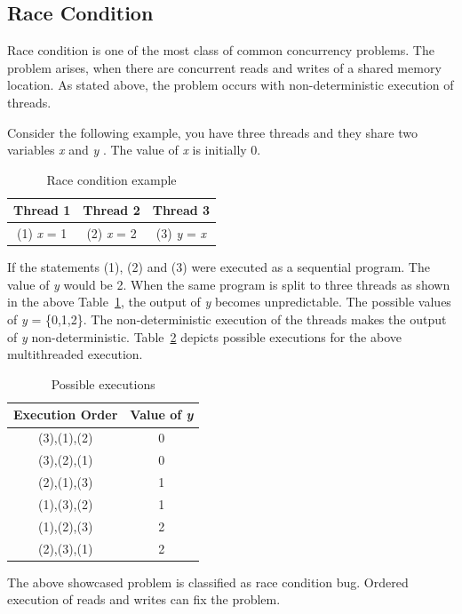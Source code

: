 \subsection{Race Condition}

Race condition is one of the most class of common concurrency problems.  
The problem arises, when there are concurrent reads and writes of a shared memory location. 
As stated above, the problem occurs with non-deterministic execution of threads. 

Consider the following example, you have three threads and they share two variables \emph{x} and \emph{y} \cite{carver2005modern}. 
The value of \emph{x} is initially 0. 

\begin{table}[h]
\centering
\begin{tabular}{*{3}{c}}
Thread 1 & Thread 2 & Thread 3 \\
\hline
 (1) \emph{x} = 1 & (2) \emph{x} = 2 & (3) \emph{y} = \emph{x}\\
\end{tabular}
\caption{Race condition example}
\label{race_cond}
\end{table}

If the statements (1), (2) and (3) were executed as a sequential program. 
The value of \emph{y} would be 2. 
When the same program is split to three threads as shown in the above Table~\ref{race_cond}, the output of \emph{y} becomes unpredictable. 
The possible values of \emph{y} = \{0,1,2\}. 
The non-deterministic execution of the threads makes the output of \emph{y} non-deterministic. 
Table~\ref{poss_exec} depicts possible executions for the above multithreaded execution. 

\begin{table}[h]
\centering
\begin{tabular}{*{2}{c}}
Execution Order & Value of \emph{y} \\
\hline
 (3),(1),(2)& 0\\
 (3),(2),(1)& 0\\
 (2),(1),(3)& 1\\
 (1),(3),(2)& 1\\
 (1),(2),(3)& 2\\
 (2),(3),(1)& 2\\
\end{tabular}
\caption{Possible executions}
\label{poss_exec}
\end{table}

The above showcased problem is classified as race condition bug. 
Ordered execution of reads and writes can fix the problem. 

